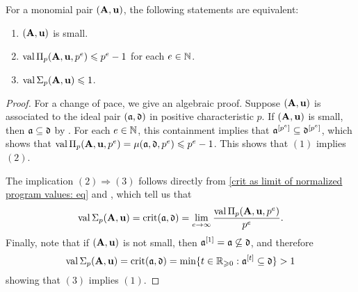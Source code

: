 \documentclass{amsart}
\begin{document}
\begin{proposition}
   \label{trivial small value bound: P}
   For a monomial pair $(\mathbf{A},\mathbf{u})$, the following statements are equivalent\textup:   
   \begin{enumerate}[$(1)$]
      \item $(\mathbf{A}, \mathbf{u})$ is small.
      \item $\operatorname{val} \Pi_p(\mathbf{A}, \mathbf{u}, p^e) \leqslant p^e-1$ for each $e\in \mathbb{N}$.
      \item $\operatorname{val} \Sigma_p(\mathbf{A},\mathbf{u}) \leqslant 1$.
   \end{enumerate}
\end{proposition}

\begin{proof}
   For a change of pace, we give an algebraic proof.
   Suppose $(\mathbf{A},\mathbf{u})$ is associated to the ideal pair $(\mathfrak{a}, \mathfrak{d})$ in positive characteristic $p$.
   If $(\mathbf{A}, \mathbf{u})$ is small, then $\mathfrak{a} \subseteq \mathfrak{d}$ by .
   For each $e\in \mathbb{N}$, this containment implies that $\mathfrak{a}^{[p^e]} \subseteq \mathfrak{d}^{[p^e]}$, which shows that $\operatorname{val} \Pi_p(\mathbf{A}, \mathbf{u}, p^e) = \mu(\mathfrak{a}, \mathfrak{d}, p^e) \leqslant p^e-1$.
   This shows that $(1)$ implies $(2)$.

   The implication $(2) \Rightarrow (3)$ follows directly from \eqref{crit as limit of normalized program values: eq} and , which tell us that
   \[\operatorname{val} \Sigma_p(\mathbf{A},\mathbf{u}) = \operatorname{crit}(\mathfrak{a},\mathfrak{d}) = \lim_{e \to \infty} \frac{\operatorname{val} \Pi_p(\mathbf{A}, \mathbf{u}, p^e)}{p^e}.\]
   Finally, note that if $(\mathbf{A},\mathbf{u})$ is not small, then $\mathfrak{a}^{[1]} = \mathfrak{a}  \not\subseteq \mathfrak{d}$, and therefore
   \[\operatorname{val} \Sigma_p(\mathbf{A},\mathbf{u}) = \operatorname{crit}(\mathfrak{a},\mathfrak{d}) = \min\{t\in \mathbb{R}_{\geqslant 0}: \mathfrak{a}^{[t]} \subseteq \mathfrak{d}\} > 1\]
   showing that $(3)$ implies $(1)$.
\end{proof}
\end{document}
